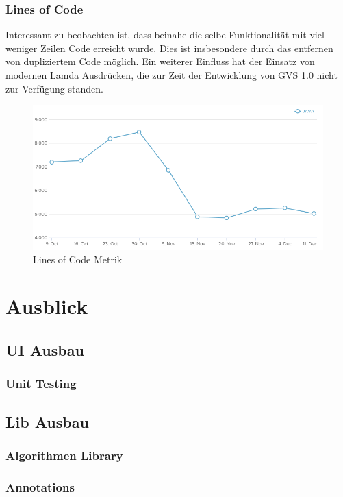 \documentclass[11pt,a4paper,english,oneside]{book}
\numberwithin{equation}{chapter}
\begin{document}
	\subsection{Lines of Code} \label{ssec:lines-code}
	Interessant zu beobachten ist, dass beinahe die selbe Funktionalität mit viel weniger Zeilen Code erreicht wurde. Dies ist insbesondere durch das entfernen von dupliziertem Code möglich. Ein weiterer Einfluss hat der Einsatz von modernen Lamda Ausdrücken, die zur Zeit der Entwicklung von GVS 1.0 nicht zur Verfügung standen.
	\begin{figure}[h!]
		\centering
		\includegraphics[width=0.7\linewidth]{assets/images/metrics/lines_of_code}
		\caption{Lines of Code Metrik}
		\label{metric-linesofcode}
	\end{figure}	
	

	\chapter{Ausblick} \label{ch:ausblick}

	
	\section{UI Ausbau}
	
	\subsection{Unit Testing}
	
	\section{Lib Ausbau}
	
	\subsection{Algorithmen Library}
	
	\subsection{Annotations}
	
\end{document}
